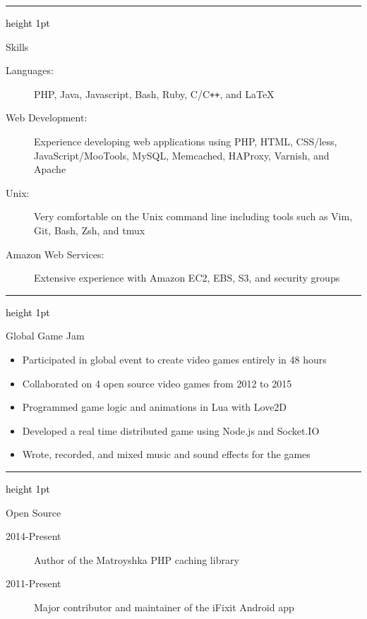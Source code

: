 \documentclass[letterpaper,10pt]{article}
\newcommand{\ressectiondivider}{
   \textcolor{black}{\hrule height 1pt}
}
\newcommand{\resitem}[1]{\item #1 \vspace{-2pt}}
\newenvironment{ressection}[1]{
   \vspace{12pt}
   \ressectiondivider
   \vspace{5pt}
   \begin{minipage}[t]{2.5cm}
      \flushleft
      {\Large #1}
   \end{minipage}
   \hfill
   \begin{minipage}[t]{16cm}
      \flushleft
}{
   \end{minipage}
}
\begin{document}
\begin{ressection}{Skills}
   \begin{description}
      \item[Languages:]
      PHP, Java, Javascript, Bash, Ruby, C/C{}\verb!++!, and \LaTeX
      \item[Web Development:]
      Experience developing web applications using PHP, HTML, CSS/less, JavaScript/MooTools, MySQL, Memcached, HAProxy, Varnish, and Apache
      \item[Unix:]
      Very comfortable on the Unix command line including tools such as Vim, Git, Bash, Zsh, and tmux
      \item[Amazon Web Services:]
      Extensive experience with Amazon EC2, EBS, S3, and security groups
   \end{description}
\end{ressection}

\begin{ressection}{Global Game Jam}
   \begin{itemize}
      \resitem{Participated in global event to create video games entirely in 48 hours}
      \resitem{Collaborated on 4 open source video games from 2012 to 2015}
      \resitem{Programmed game logic and animations in Lua with Love2D}
      \resitem{Developed a real time distributed game using Node.js and Socket.IO}
      \resitem{Wrote, recorded, and mixed music and sound effects for the games}
   \end{itemize}
\end{ressection}

\begin{ressection}{Open Source}
   \begin{description}
      \item[2014-Present] Author of the Matroyshka PHP caching library
      \item[2011-Present] Major contributor and maintainer of the iFixit Android app
   \end{description}
\end{ressection}
\end{document}
